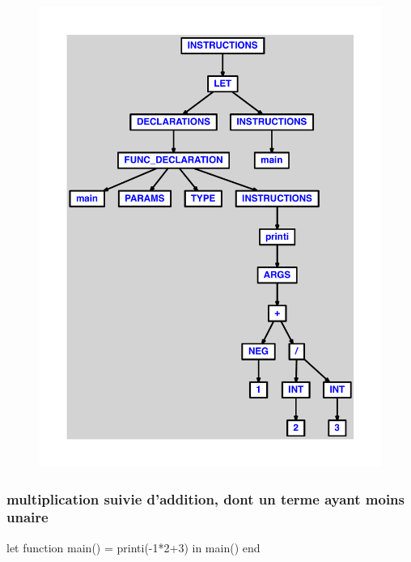 \documentclass{article}
\begin{document}
\begin{figure}[H]\centering\includegraphics[max width=\textwidth]{ast/ast_70.pdf}\end{figure}\subsubsection{multiplication suivie d'addition, dont un terme ayant moins unaire}
\begin{verbatimtab}
let
	function main() = printi(-1*2+3)
in main() end
\end{verbatimtab}
\end{document}

